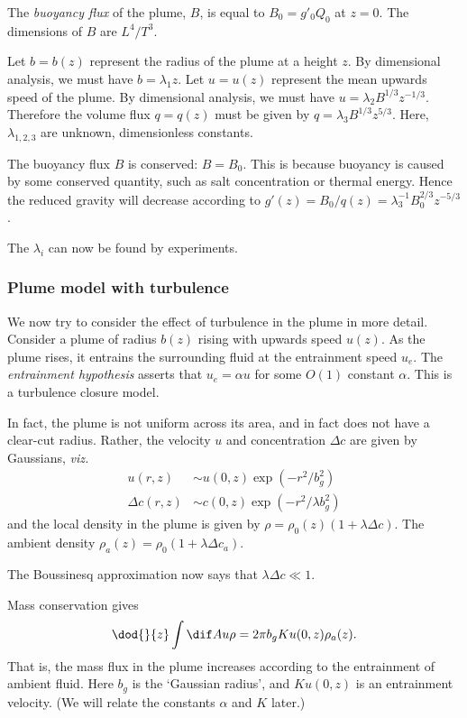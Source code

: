 The \textit{buoyancy flux} of the plume, $B$, is equal to $B_0 = g'_0 Q_0$ at
$z=0$. The dimensions of $B$ are $L^4 /T^3$.

Let $b = b(z)$ represent the radius of the plume at a height $z$. By dimensional
analysis, we must have $b = \lambda_1 z$.  Let $u = u(z)$ represent the mean
upwards speed of the plume. By dimensional analysis, we must have $u = \lambda_2
B^{1/3} z^{-1/3}$.  Therefore the volume flux $q = q(z)$ must be given by $q =
\lambda_3 B^{1/3} z^{5/3}$. Here, $\lambda_{1,2,3}$ are unknown, dimensionless
constants.

The buoyancy flux $B$ is conserved: $B = B_0$. This is because buoyancy is
caused by some conserved quantity, such as salt concentration or thermal energy.
Hence the reduced gravity will decrease according to $g'(z) = B_0 / q(z) =
\lambda_3^{-1} B_0^{2/3} z^{-5/3}$.

The $\lambda_i$ can now be found by experiments.

\subsubsection{Plume model with turbulence}

We now try to consider the effect of turbulence in the plume in more detail.
Consider a plume of radius $b(z)$ rising with upwards speed $u(z)$.  As the
plume rises, it entrains the surrounding fluid at the entrainment speed $u_e$.
The \textit{entrainment hypothesis} asserts that $u_e = \alpha u$ for some
$O(1)$ constant $\alpha$. This is a turbulence closure model.

In fact, the plume is not uniform across its area, and in fact does not have a
clear-cut radius. Rather, the velocity $u$ and concentration $\Delta c$ are given
by Gaussians, \textit{viz.}
\begin{align}
    u(r,z) &\sim u(0,z) \exp(-r^2/b_g^2) \\
    \Delta c(r,z) &\sim c(0,z) \exp(-r^2/\lambda b_g^2)
\end{align}
and the local density in the plume is given by $\rho = \rho_0(z) (1+\lambda \Delta c)$. The
ambient density $\rho_a(z) = \rho_0 (1+\lambda\Delta c_a)$.

The Boussinesq approximation now says that $\lambda\Delta c \ll 1$.

Mass conservation gives
\begin{equation}
    \dod{}{z} \int \dif A u \rho = 2\pi b_g K u(0,z) \rho_a(z).
\end{equation}
That is, the mass flux in the plume increases according to the entrainment of
ambient fluid. Here $b_g$ is the `Gaussian radius', and $K u(0,z)$ is an
entrainment velocity. (We will relate the constants $\alpha$ and $K$ later.)

